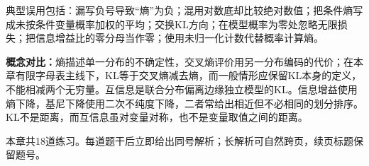 \begin{warningbox}
典型误用包括：漏写负号导致“熵”为负；混用对数底却比较绝对数值；把条件熵写成未按条件变量概率加权的平均；交换KL方向；在模型概率为零处忽略无限损失；把信息增益比的零分母当作零；使用未归一化计数代替概率计算熵。
\end{warningbox}

\label{struct:V1-C06-CH33}
\begin{comparisonbox}
\textbf{概念对比：}熵描述单一分布的不确定性，交叉熵评价用另一分布编码的代价；在本章有限字母表主线下，KL等于交叉熵减去熵，而一般情形应保留KL本身的定义，不能相减两个无穷量。互信息是联合分布偏离边缘独立模型的KL。信息增益使用熵下降，基尼下降使用二次不纯度下降，二者常给出相近但不必相同的划分排序。KL不是距离，而互信息虽对变量对称，也不是变量取值之间的距离。
\end{comparisonbox}

\begin{chapterexercisebox}
\label{struct:V1-C06-CH34}
\label{struct:V1-C06-CH35}
本章共18道练习。每道题干后立即给出同号解析；长解析可自然跨页，续页标题保留题号。
\end{chapterexercisebox}

